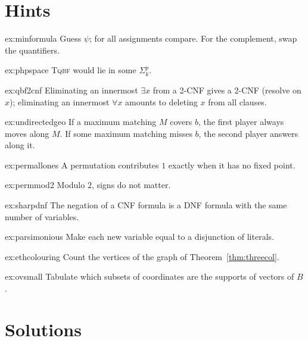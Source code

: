 \section{Hints}

\begin{hint}{ex:minformula}
Guess $\psi$; for all assignments compare. For the complement, swap the quantifiers.
\end{hint}
\begin{hint}{ex:phpspace}
\textup{\textsc{Tqbf}} would lie in some $\Sigma_k^p$.
\end{hint}
\begin{hint}{ex:qbf2cnf}
Eliminating an innermost $\exists x$ from a 2-CNF gives a 2-CNF (resolve on $x$); eliminating an innermost $\forall x$ amounts to deleting $x$ from all clauses.
\end{hint}
\begin{hint}{ex:undirectedgeo}
If a maximum matching $M$ covers $b$, the first player always moves along $M$. If some maximum matching misses $b$, the second player answers along it.
\end{hint}
\begin{hint}{ex:permallones}
A permutation contributes $1$ exactly when it has no fixed point.
\end{hint}
\begin{hint}{ex:permmod2}
Modulo $2$, signs do not matter.
\end{hint}
\begin{hint}{ex:sharpdnf}
The negation of a CNF formula is a DNF formula with the same number of variables.
\end{hint}
\begin{hint}{ex:parsimonious}
Make each new variable equal to a disjunction of literals.
\end{hint}
\begin{hint}{ex:ethcolouring}
Count the vertices of the graph of Theorem~\ref{thm:threecol}.
\end{hint}
\begin{hint}{ex:ovsmall}
Tabulate which subsets of coordinates are the supports of vectors of $B$.
\end{hint}

\section{Solutions}

